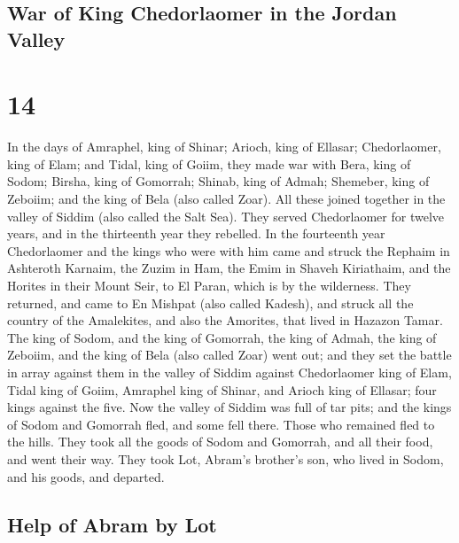 \hypertarget{war-of-king-chedorlaomer-in-the-jordan-valley}{%
\subsection{War of King Chedorlaomer in the Jordan
Valley}\label{war-of-king-chedorlaomer-in-the-jordan-valley}}

\hypertarget{section-13}{%
\section{14}\label{section-13}}

 In the days of Amraphel, king of Shinar; Arioch, king of
Ellasar; Chedorlaomer, king of Elam; and Tidal, king of Goiim,
 they made war with Bera, king of Sodom; Birsha, king of
Gomorrah; Shinab, king of Admah; Shemeber, king of Zeboiim; and the king
of Bela (also called Zoar).  All these joined together in
the valley of Siddim (also called the Salt Sea).  They
served Chedorlaomer for twelve years, and in the thirteenth year they
rebelled.  In the fourteenth year Chedorlaomer and the
kings who were with him came and struck the Rephaim in Ashteroth
Karnaim, the Zuzim in Ham, the Emim in Shaveh Kiriathaim, 
and the Horites in their Mount Seir, to El Paran, which is by the
wilderness.  They returned, and came to En Mishpat (also
called Kadesh), and struck all the country of the Amalekites, and also
the Amorites, that lived in Hazazon Tamar.  The king of
Sodom, and the king of Gomorrah, the king of Admah, the king of Zeboiim,
and the king of Bela (also called Zoar) went out; and they set the
battle in array against them in the valley of Siddim 
against Chedorlaomer king of Elam, Tidal king of Goiim, Amraphel king of
Shinar, and Arioch king of Ellasar; four kings against the five.
 Now the valley of Siddim was full of tar pits; and the
kings of Sodom and Gomorrah fled, and some fell there. Those who
remained fled to the hills.  They took all the goods of
Sodom and Gomorrah, and all their food, and went their way.
 They took Lot, Abram's brother's son, who lived in
Sodom, and his goods, and departed.

\hypertarget{help-of-abram-by-lot}{%
\subsection{Help of Abram by Lot}\label{help-of-abram-by-lot}}


